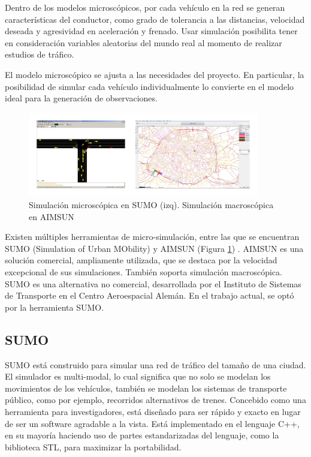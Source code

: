 Dentro de los modelos microscópicos, por cada vehículo en la red se generan características del conductor, como grado de tolerancia a las distancias, velocidad deseada y agresividad en aceleración y frenado. Usar simulación posibilita tener en consideración variables aleatorias del mundo real al momento de realizar estudios de tráfico.

El modelo microscópico se ajusta a las necesidades del proyecto. En particular, la posibilidad de simular cada vehículo individualmente lo convierte en el modelo ideal para la generación de observaciones.

 \begin{figure}[!htp]
	\centering
	\includegraphics[width=0.9\textwidth]{images/sumo-aimsun.png}
	\caption{Simulación microscópica en SUMO (izq). Simulación macroscópica en AIMSUN}
    \label{fig:sumo-aimsun}
\end{figure}

Existen múltiples herramientas de micro-simulación, entre las que se encuentran SUMO (Simulation of Urban MObility) y AIMSUN (Figura \ref{fig:sumo-aimsun}) \cite{ronaldo2012comparison}. AIMSUN es una solución comercial, ampliamente utilizada, que se destaca por la velocidad excepcional de sus simulaciones. También soporta simulación macroscópica.  SUMO es una alternativa no comercial, desarrollada por el Instituto de Sistemas de Transporte en el Centro Aeroespacial Alemán. En el trabajo actual, se optó por la herramienta SUMO.

\subsection{SUMO}

SUMO está construido para simular una red de tráfico del tamaño de una ciudad. El simulador es multi-modal, lo cual significa que no solo se modelan los movimientos de los vehículos, también se modelan los sistemas de transporte público, como por ejemplo, recorridos alternativos de trenes. Concebido como una herramienta para investigadores, está diseñado para ser rápido y exacto en lugar de ser un software agradable a la vista. Está implementado en el lenguaje C++, en su mayoría haciendo uso de partes estandarizadas del lenguaje, como la biblioteca STL, para maximizar la portabilidad.

